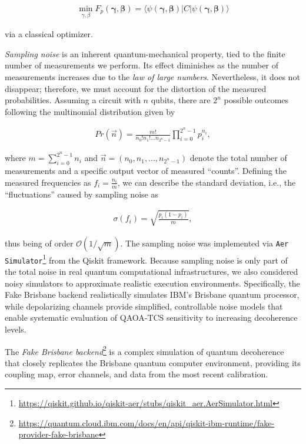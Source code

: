 \begin{align}
    \min_{\gamma, \beta} F_p(\mathbf{\gamma}, \mathbf{\beta}) = \langle \psi(\mathbf{\gamma}, \mathbf{\beta}) | C | \psi(\mathbf{\gamma}, \mathbf{\beta}) \rangle
\end{align}

via a classical optimizer.
\smallskip

\textit{Sampling noise} is an inherent quantum-mechanical property, tied to the finite number of measurements we perform. Its effect diminishes as the number of measurements increases due to the \textit{law of large numbers}. Nevertheless, it does not disappear; therefore, we must account for the distortion of the measured probabilities. Assuming a circuit with $n$ qubits, there are $2^n$ possible outcomes following the multinomial distribution given by

\begin{align}
    Pr(\overrightarrow{n}) = \frac{m!}{n_0!n_1!\ldots n_{2^n-1}}\prod_{i=0}^{2^n-1}p_i^{n_i},
\end{align}

where $m=\sum_{i=0}^{2^n-1}n_i$ and $\overrightarrow{n}=(n_0, n_1, \ldots, n_{2^n-1})$ denote the total number of measurements and a specific output vector of measured ``counts''. Defining the measured frequencies as $f_i = \frac{n_i}{m}$, we can describe the standard deviation, i.e., the ``fluctuations'' caused by sampling noise as 

\begin{align}
    \sigma(f_i) = \sqrt{\frac{p_i(1-p_i)}{m}},
\end{align}

thus being of order $\mathcal{O}(1/\sqrt{m})$. The sampling noise was implemented via \texttt{Aer Simulator}\footnote{\url{https://qiskit.github.io/qiskit-aer/stubs/qiskit_aer.AerSimulator.html}} from the Qiskit framework. Because sampling noise is only part of the total noise in real quantum computational infrastructures, we also considered noisy simulators to approximate realistic execution environments. Specifically, the Fake Brisbane backend realistically simulates IBM's Brisbane quantum processor, while depolarizing channels provide simplified, controllable noise models that enable systematic evaluation of QAOA-TCS sensitivity to increasing decoherence levels.
\smallskip

The \textit{Fake Brisbane backend}\footnote{\url{https://quantum.cloud.ibm.com/docs/en/api/qiskit-ibm-runtime/fake-provider-fake-brisbane}} is a complex simulation of quantum decoherence that closely replicates the Brisbane quantum computer environment, providing its coupling map, error channels, and data from the most recent calibration.

